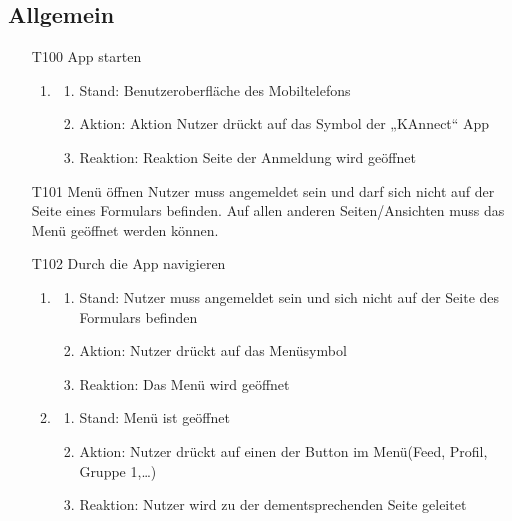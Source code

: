 \documentclass[parskip=full]{scrartcl}
\begin{document}
		\subsection{Allgemein}
		
		\begin{itemize}
			\item[T100] \gls{App} starten
			\begin{enumerate}
				\item
				\begin{enumerate}[nosep]	
					\item Stand: Benutzeroberfläche des Mobiltelefons
					\item Aktion: Aktion Nutzer drückt auf das  Symbol der „KAnnect“ \gls{App}
					\item Reaktion: Reaktion  Seite der Anmeldung wird geöffnet
				\end{enumerate} 
			\end{enumerate}
			
			
			
			\item[T101] Menü öffnen
			Nutzer muss angemeldet sein und darf sich nicht auf der Seite eines Formulars befinden. Auf allen anderen Seiten/Ansichten muss das Menü geöffnet werden können.

		
		
		
		\item[T102] Durch die \gls{App} navigieren
		\begin{enumerate}
			\item
			\begin{enumerate}[nosep]	
				\item Stand: Nutzer muss angemeldet sein und sich nicht auf der Seite des Formulars befinden
				\item Aktion: Nutzer  drückt auf das Menüsymbol
				\item Reaktion:  Das Menü wird geöffnet
			\end{enumerate} 
			\item
			\begin{enumerate}[nosep]	
				\item Stand: Menü ist geöffnet
				\item Aktion: Nutzer drückt auf einen der \gls{Button} im Menü(\gls{Feed}, Profil, Gruppe 1,…)
				\item Reaktion: Nutzer wird zu der dementsprechenden Seite geleitet
			\end{enumerate}
		\end{enumerate}
		

\end{itemize}
\end{document}
